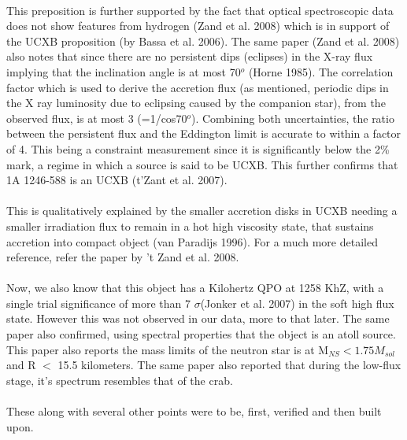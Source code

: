 \documentclass[a4paper,twoside]{report}
\numberwithin{equation}{section}
\begin{document}
\paragraph{}
This preposition is further supported by the fact that optical spectroscopic data does not show features from hydrogen (Zand et al. 2008) which is in support of the UCXB proposition (by Bassa et al. 2006). The same paper (Zand et al. 2008) also notes that since there are no persistent dips (eclipses) in the X-ray flux implying that the inclination angle is at most 70$^o$ (Horne 1985). The correlation factor which is used to derive the accretion flux (as mentioned, periodic dips in the X ray luminosity due to eclipsing caused by the companion star), from the observed flux, is at most 3 (=1/cos70$^o$). Combining both uncertainties, the ratio between the persistent flux and the Eddington limit is accurate to within a factor of 4. This being a constraint measurement since it is significantly below the 2\% mark, a regime in which a source is said to be UCXB. This further confirms that 1A 1246-588 is an UCXB (t'Zant et al. 2007). 
\paragraph{}
This is qualitatively explained by the smaller accretion disks in UCXB needing a smaller irradiation flux to remain in a hot high viscosity state, that sustains accretion into compact object (van Paradijs 1996). For a much more detailed reference, refer the paper by 't Zand et al. 2008.
\paragraph{}
Now, we also know that this object has a Kilohertz QPO at 1258 KhZ, with a single trial significance of more than 7 $\sigma$(Jonker et al. 2007) in the soft high flux state. However this was not observed in our data, more to that later. The same paper also confirmed, using spectral properties that the object is an atoll source. This paper also reports the mass limits of the neutron star is at M$_{NS} < 1.75 M_{sol}$ and R $<$ 15.5 kilometers. The same paper also reported that during the low-flux stage, it's spectrum resembles that of the crab.
\paragraph{}
These along with several other points were to be, first, verified and then built upon.
\end{document}
